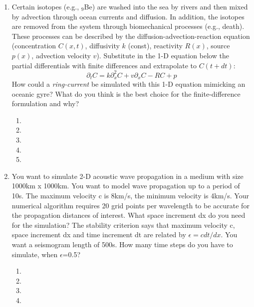 \begin{enumerate}
\begin{enumerate}
\item[]
\item[]
\item[] 
\item[]
\item[] 
\end{enumerate}
\item 
Certain isotopes (e.g., $_9$Be) are washed into the sea by rivers and then mixed by advection through ocean currents and diffusion. In addition, the isotopes are removed from the system through biomechanical processes (e.g., death). These processes can be described by the diffusion-advection-reaction equation (concentration $C(x,t)$, diffusivity $k$ (const), reactivity $R(x)$, source $p(x)$, advection velocity $v$). Substitute in the 1-D equation below the partial differentials with finite differences and extrapolate to $C(t+dt)$: 
\begin{displaymath}
\partial_t C = k \partial^2_x C + v \partial_x C - R C + p
\end{displaymath}
How could a {\it ring-current} be simulated with this 1-D equation mimicking an oceanic gyre? What do you think is the best choice for the finite-difference formulation and why?   
\begin{enumerate}
\item[]
\item[]
\item[] 
\item[]
\item[] 
\end{enumerate}
\item
You want to simulate 2-D acoustic wave propagation in a medium with size 1000km x 1000km. You want to model wave propagation up to a period of 10s. The maximum velocity c is 8km/s, the minimum velocity is 4km/s. Your numerical algorithm requires 20 grid points per wavelength to be accurate for the propagation distances of interest. What space increment dx do you need for the simulation?
The stability criterion says that maximum velocity c, space increment dx and time increment dt are related by $\epsilon=c dt/dx$. You want a seismogram length of 500s. How many time steps do you have to simulate, when $\epsilon$=0.5? 
\begin{enumerate}
\item[]
\item[]
\item[] 
\item[]

\end{enumerate}
\end{enumerate}
